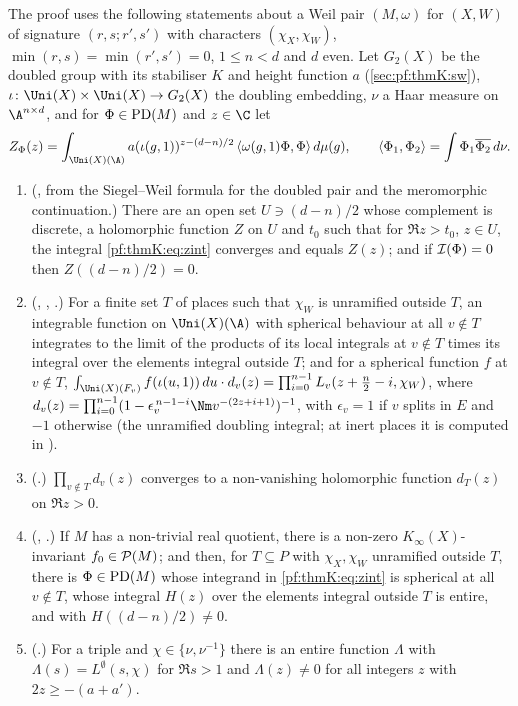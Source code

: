 The proof uses the following statements about a Weil pair $(M,\omega)$ for $(X,W)$ of signature $(r,s;r',s')$ with
characters $(\chi_X,\chi_W)$, $\min(r,s)=\min(r',s')=0$, $1\le n<d$ and $d$ even. Let $G_2(X)$ be the doubled group with its
stabiliser $K$ and height function $a$ (\cref{sec:pf:thmK:sw}), $\iota\colon\Uni(X)\times\Uni(X)\to G_2(X)$ the doubling
embedding, $\nu$ a Haar measure on $\A^{n\times d}$, and for $\Phi\in\operatorname{PD}(M)$ and $z\in\C$ let
\begin{equation}\label{pf:thmK:eq:zint}
Z_\Phi(z)=\int_{\Uni(X)(\A)}a(\iota(g,1))^{z-(d-n)/2}\,\langle\omega(g,1)\Phi,\Phi\rangle\,d\mu(g),\qquad
\langle\Phi_1,\Phi_2\rangle=\int\Phi_1\overline{\Phi_2}\,d\nu .
\end{equation}
\begin{enumerate}[label=(D\arabic*)]
\item\label{pf:thmK:D:norm} (, from the Siegel--Weil formula for the doubled pair
and the meromorphic continuation.) There are an open set $U\ni(d-n)/2$ whose complement is discrete, a holomorphic
function $Z$ on $U$ and $t_0$ such that for $\Re z>t_0$, $z\in U$, the integral \eqref{pf:thmK:eq:zint} converges and equals
$Z(z)$; and if $\mathcal{I}(\Phi)=0$ then $Z((d-n)/2)=0$.
\item\label{pf:thmK:D:euler} (, ,
.) For a finite set $T$ of places such that $\chi_W$ is unramified outside $T$, an
integrable function on $\Uni(X)(\A)$ with spherical behaviour at all $v\notin T$ integrates to the limit of the products of its
local integrals at $v\notin T$ times its integral over the elements integral outside $T$; and for a spherical function $f$ at
$v\notin T$, $\int_{\Uni(X)(F_v)}f(\iota(u,1))\,du\cdot d_v(z)=\prod_{i=0}^{n-1}L_v(z+\tfrac n2-i,\chi_W)$, where
$d_v(z)=\prod_{i=0}^{n-1}(1-\epsilon_v^{\,n-1-i}\Nm v^{-(2z+i+1)})^{-1}$, with $\epsilon_v=1$ if $v$ splits in $E$ and $-1$
otherwise (the unramified doubling integral; at inert places it is computed in ).
\item\label{pf:thmK:D:dprod} (.) $\prod_{v\notin T}d_v(z)$ converges to a non-vanishing
holomorphic function $d_T(z)$ on $\Re z>0$.
\item\label{pf:thmK:D:bad} (, .) If $M$ has a
non-trivial real quotient, there is a non-zero $K_\infty(X)$-invariant $f_0\in\mathcal{P}(M)$; and then, for $T\subseteq P$ with
$\chi_X,\chi_W$ unramified outside $T$, there is $\Phi\in\operatorname{PD}(M)$ whose integrand in \eqref{pf:thmK:eq:zint} is spherical at
all $v\notin T$, whose integral $H(z)$ over the elements integral outside $T$ is entire, and with $H((d-n)/2)\ne0$.
\item\label{pf:thmK:D:lint} (.) For a triple and $\chi\in\{\nu,\nu^{-1}\}$ there is an
entire function $\Lambda$ with $\Lambda(s)=L^{\emptyset}(s,\chi)$ for $\Re s>1$ and $\Lambda(z)\ne0$ for all integers $z$ with
$2z\ge-(a+a')$.
\end{enumerate}

